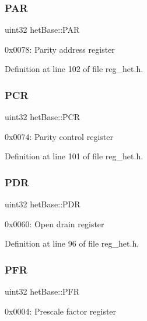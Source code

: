 \mbox{\label{structhetBase_aefa9662afda35a3b9dec88bd8f80bcc0}} 
\subsubsection{\texorpdfstring{P\+AR}{PAR}}
{\footnotesize\ttfamily uint32 het\+Base\+::\+P\+AR}

0x0078\+: Parity address register 

Definition at line 102 of file reg\+\_\+het.\+h.

\mbox{\label{structhetBase_a332c49b915eead2de647a3581e137ebd}} 
\subsubsection{\texorpdfstring{P\+CR}{PCR}}
{\footnotesize\ttfamily uint32 het\+Base\+::\+P\+CR}

0x0074\+: Parity control register 

Definition at line 101 of file reg\+\_\+het.\+h.

\mbox{\label{structhetBase_aba71d231185c1720549000b8b86074d5}} 
\subsubsection{\texorpdfstring{P\+DR}{PDR}}
{\footnotesize\ttfamily uint32 het\+Base\+::\+P\+DR}

0x0060\+: Open drain register 

Definition at line 96 of file reg\+\_\+het.\+h.

\mbox{\label{structhetBase_a5577d008bd9cde655f33e5f1b24e7c82}} 
\subsubsection{\texorpdfstring{P\+FR}{PFR}}
{\footnotesize\ttfamily uint32 het\+Base\+::\+P\+FR}

0x0004\+: Prescale factor register 

